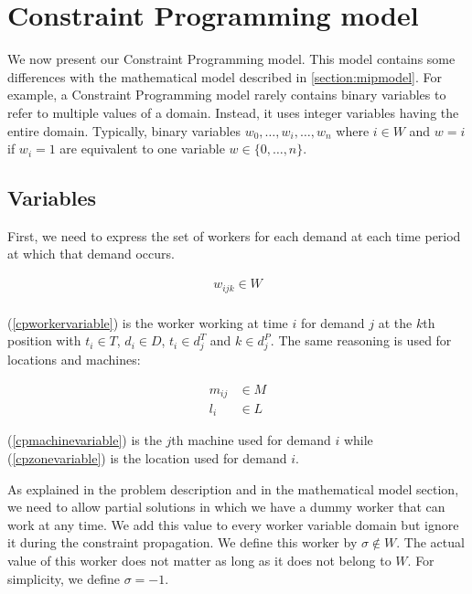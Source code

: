 \documentclass[../../thesis.tex]{subfiles}
\begin{document}
\section{Constraint Programming model}
\label{section:cpmodel}

We now present our Constraint Programming model. This model contains some differences
with the mathematical model described in \autoref{section:mipmodel}.
For example, a Constraint Programming model rarely contains binary variables to refer to multiple values 
of a domain. Instead, it uses integer variables having the entire domain. 
Typically, binary variables $w_0, \dots, w_i, \dots, w_n$ where $i \in W$ and $w = i$ if $w_i = 1$ are equivalent to 
one variable $w \in \{0, \dots, n\}$.



\subsection{Variables}

First, we need to express the set of workers for each demand at each time period at which that demand occurs.

\begin{equation}
\begin{split}
    w_{ijk} \in W \label{cpworkervariable} \\
\end{split}
\end{equation}

(\ref{cpworkervariable}) is the worker working at time $i$ for demand $j$ at the $k$th position 
with $t_i \in T$, $d_i \in D$, $t_i \in d_j^T$ and $k \in d^P_j$. The same reasoning is used for locations and machines:

\begin{align}
    m_{ij} &\in M \label{cpmachinevariable} \\ 
    l_i &\in L \label{cpzonevariable} 
\end{align}

(\ref{cpmachinevariable}) is the $j$th machine used for demand $i$ while (\ref{cpzonevariable}) is the location used for demand $i$.



As explained in the problem description and in the mathematical model section,
we need to allow partial solutions in which we have a dummy worker that can work at any time.
We add this value to every worker variable domain but ignore it during the constraint propagation. We define 
this worker by $\sigma \notin W$. The actual value of this worker does not matter as long as it does not belong to $W$. For simplicity, we define $\sigma = -1$.
\end{document}
